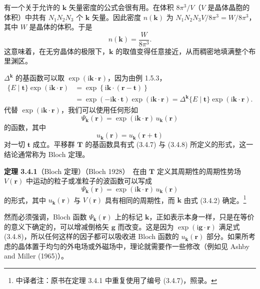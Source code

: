 有一个关于允许的 $\mathbf{k}$ 矢量密度的公式会很有用。在体积 $8\pi^{3}/V$（$V$ 是晶体晶胞的体积）中共有 $N_{1}N_{2}N_{3}$ 个 $\mathbf{k}$ 矢量。因此密度 $n(\mathbf{k})$ 为 $N_{1}N_{2}N_{3}V/8\pi^{3} = W/8\pi^{3}$，其中 $W$ 是晶体的体积。于是
\begin{equation*}
n(\mathbf{k}) = \frac{W}{8\pi^{3}}.
\tag{3.4.5}
\end{equation*}
这意味着，在无穷晶体的极限下，$\mathbf{k}$ 的取值变得任意接近，从而稠密地填满整个布里渊区。

$\Delta^{\mathbf{k}}$ 的基函数可以取 $\exp(\mathrm{i}\mathbf{k} \cdot \mathbf{r})$，因为由例 1.5.3，
\begin{equation*}
\begin{aligned}
\{E \mid \mathbf{t}\}\exp(\mathrm{i}\mathbf{k} \cdot \mathbf{r}) &= \exp\left\{\mathrm{i}\mathbf{k} \cdot (\mathbf{r} - \mathbf{t})\right\} \\
&= \exp(-\mathrm{i}\mathbf{k} \cdot \mathbf{t})\exp(\mathrm{i}\mathbf{k} \cdot \mathbf{r}) = \Delta^{\mathbf{k}}\{E \mid \mathbf{t}\}\exp(\mathrm{i}\mathbf{k} \cdot \mathbf{r}).
\end{aligned}
\tag{3.4.6}
\end{equation*}
代替 $\exp(\mathrm{i}\mathbf{k} \cdot \mathbf{r})$，我们可以使用任何形如
\begin{equation*}
\Psi_{\mathbf{k}}(\mathbf{r}) = \exp(\mathrm{i}\mathbf{k} \cdot \mathbf{r})\,u_{\mathbf{k}}(\mathbf{r})
\tag{3.4.7}
\end{equation*}
的函数，其中
\begin{equation*}
u_{\mathbf{k}}(\mathbf{r}) = u_{\mathbf{k}}(\mathbf{r} + \mathbf{t})
\tag{3.4.8}
\end{equation*}
对一切 $\mathbf{t}$ 成立。平移群 $\mathbf{T}$ 的基函数具有式 (3.4.7) 与 (3.4.8) 所定义的形式，这一结论通常称为 Bloch 定理。

\noindent\textbf{定理 3.4.1}\quad （Bloch 定理）（Bloch 1928）\ 在由 $\mathbf{T}$ 定义其周期性的周期性势场 $V(\mathbf{r})$ 中运动的粒子或准粒子的波函数可以写成
\begin{equation*}
\Psi_{\mathbf{k}}(\mathbf{r}) = \exp(\mathrm{i}\mathbf{k} \cdot \mathbf{r})\,u_{\mathbf{k}}(\mathbf{r})
\tag{3.4.7}
\end{equation*}
的形式，其中 $u_{\mathbf{k}}(\mathbf{r})$ 与 $V(\mathbf{r})$ 具有相同的周期性，而 $\mathbf{k}$ 由式 (3.4.2) 确定。\footnote{中译者注：原书在定理 3.4.1 中重复使用了编号 (3.4.7)，照录。}

然而必须强调，Bloch 函数 $\Psi_{\mathbf{k}}(\mathbf{r})$ 上的标记 $\mathbf{k}$，正如表示本身一样，只是在等价的意义下确定的，可以增减倒格矢 $\mathbf{g}$ 而改变。这是因为 $\exp(\mathrm{i}\mathbf{g} \cdot \mathbf{r})$ 满足式 (3.4.8)，所以任何这样的因子都可以吸收进 Bloch 函数的 $u_{\mathbf{k}}(\mathbf{r})$ 部分。如果所考虑的晶体置于均匀的外电场或外磁场中，理论就需要作一些修改（例如见 Ashby and Miller (1965)）。
